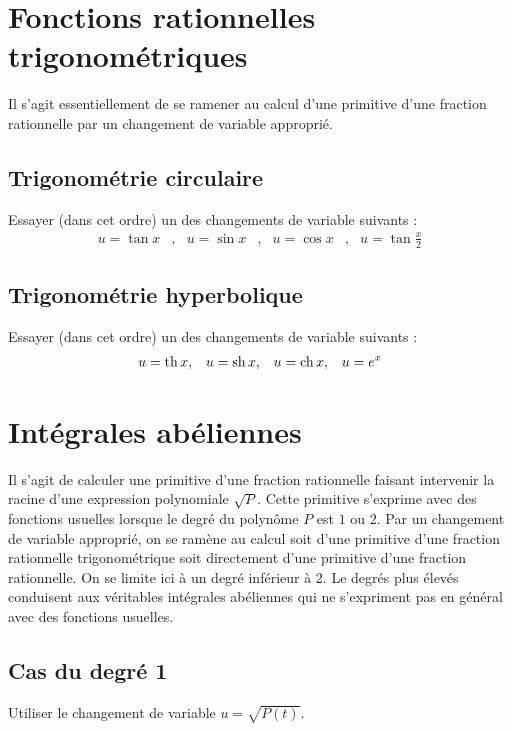 \section{Fonctions rationnelles trigonométriques}
Il s'agit essentiellement de se ramener au calcul d'une primitive d'une fraction rationnelle par un changement de variable approprié.
\subsection{Trigonométrie circulaire}
Essayer (dans cet ordre) un des changements de variable suivants :
\begin{align*}
 u=\tan x &,& u=\sin x &,& u=\cos x &,& u=\tan \frac{x}{2}
\end{align*}
\subsection{Trigonométrie hyperbolique}
Essayer (dans cet ordre) un des changements de variable suivants :
\begin{align*}
 u=\mathop{\mathrm{th}} x &,& u=\mathop{\mathrm{sh}} x &,& u=\mathop{\mathrm{ch}} x &,& u= e^{x}
\end{align*}

\section{Intégrales \og abéliennes\fg}
Il s'agit de calculer une primitive d'une fraction rationnelle faisant intervenir la racine d'une expression polynomiale $\sqrt{P}$. Cette primitive s'exprime avec des fonctions usuelles lorsque le degré du polynôme $P$ est $1$ ou $2$. Par un changement de variable approprié, on se ramène au calcul soit d'une primitive d'une fraction rationnelle trigonométrique soit directement d'une primitive d'une fraction rationnelle.\newline
On se limite ici à un degré inférieur à 2.  Le degrés plus élevés conduisent aux véritables intégrales abéliennes qui ne s'expriment pas en général avec des fonctions usuelles.
\subsection{Cas du degré 1}
Utiliser le changement de variable $u=\sqrt{P(t)}$.
